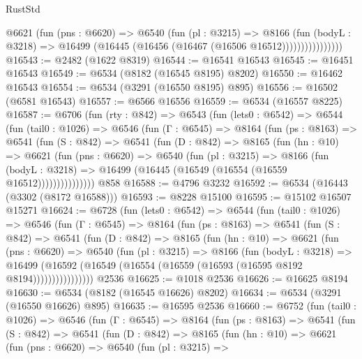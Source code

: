 \begin{lexlean}{RustStd}
\begin{coremodule}
                    @6621
                      (fun (pns : @6620) =>
                      @6540
                        (fun (pl : @3215) =>
                        @8166
                          (fun (bodyL : @3218) =>
                          @16499 (@16445 (@16456 (@16467 (@16506 @16512))))))))))))))))
@16543 := @2482 (@1622 @8319)
@16544 := @16541 @16543
@16545 := @16451 @16543
@16549 := @6534 (@8182 (@16545 @8195) @8202)
@16550 := @16462 @16543
@16554 := @6534 (@3291 (@16550 @8195) @895)
@16556 := @16502 (@6581 @16543)
@16557 := @6566 @16556
@16559 := @6534 (@16557 @8225)
@16587 := @6706
    (fun (rty : @842) =>
    @6543
      (fun (lets0 : @6542) =>
      @6544
        (fun (tail0 : @1026) =>
        @6546
          (fun (Γ : @6545) =>
          @8164
            (fun (ps : @8163) =>
            @6541
              (fun (S : @842) =>
              @6541
                (fun (D : @842) =>
                @8165
                  (fun (hn : @10) =>
                  @6621
                    (fun (pns : @6620) =>
                    @6540
                      (fun (pl : @3215) =>
                      @8166
                        (fun (bodyL : @3218) =>
                        @16499 (@16445 (@16549 (@16554 (@16559 @16512)))))))))))))))
    @858
@16588 := @4796 @3232
@16592 := @6534 (@16443 (@3302 (@8172 @16588)))
@16593 := @8228 @15100
@16595 := @15102 @16507 @15271
@16624 := @6728
    (fun (lets0 : @6542) =>
    @6544
      (fun (tail0 : @1026) =>
      @6546
        (fun (Γ : @6545) =>
        @8164
          (fun (ps : @8163) =>
          @6541
            (fun (S : @842) =>
            @6541
              (fun (D : @842) =>
              @8165
                (fun (hn : @10) =>
                @6621
                  (fun (pns : @6620) =>
                  @6540
                    (fun (pl : @3215) =>
                    @8166
                      (fun (bodyL : @3218) =>
                      @16499
                        (@16592 (@16549 (@16554 (@16559 (@16593 (@16595 @8192 @8194))))))))))))))))
    @2536
@16625 := @1018 @2536
@16626 := @16625 @8194
@16630 := @6534 (@8182 (@16545 @16626) @8202)
@16634 := @6534 (@3291 (@16550 @16626) @895)
@16635 := @16595 @2536
@16660 := @6752
    (fun (tail0 : @1026) =>
    @6546
      (fun (Γ : @6545) =>
      @8164
        (fun (ps : @8163) =>
        @6541
          (fun (S : @842) =>
          @6541
            (fun (D : @842) =>
            @8165
              (fun (hn : @10) =>
              @6621
                (fun (pns : @6620) =>
                @6540
                  (fun (pl : @3215) =>

\end{coremodule}
\end{lexlean}

